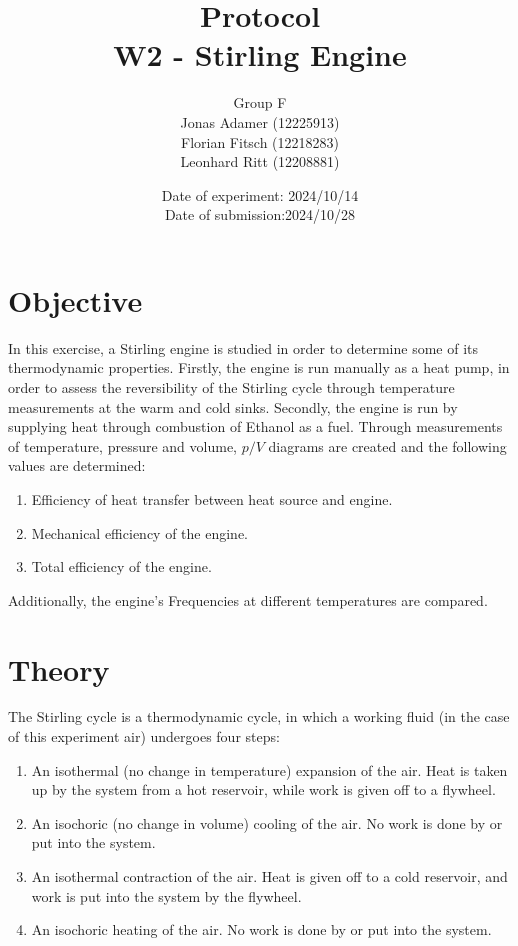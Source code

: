 \documentclass[titlepage]{article}
\title{Protocol \\ W2 - Stirling Engine}
\author{Group F\\Jonas Adamer (12225913)\\Florian Fitsch (12218283)\\Leonhard Ritt (12208881)}
\date{Date of experiment: 2024/10/14\\Date of submission:2024/10/28}
\begin{document}
\maketitle
\thispagestyle{empty}

\newpage
\tableofcontents
\thispagestyle{fancy}


\newpage
\section{Objective}
In this exercise, a Stirling engine is studied in order to determine some of its thermodynamic properties. Firstly, the engine is run manually as a heat pump, in order to assess the reversibility of the Stirling cycle through temperature measurements at the warm and cold sinks. Secondly, the engine is run by supplying heat through combustion of Ethanol as a fuel. Through measurements of temperature, pressure and volume, \(p/V\) diagrams are created and the following values are determined:
\begin{enumerate}
    \item Efficiency of heat transfer between heat source and engine.
    \item Mechanical efficiency of the engine.
    \item Total efficiency of the engine.
\end{enumerate}
Additionally, the engine's Frequencies at different temperatures are compared. 


\section{Theory}
The Stirling cycle is a thermodynamic cycle, in which a working fluid (in the case of this experiment air) undergoes four steps:
%
\begin{enumerate}
    \item An isothermal (no change in temperature) expansion of the air. Heat is taken up by the system from a hot reservoir, while work is given off to a flywheel.
    \item An isochoric (no change in volume) cooling of the air. No work is done by or put into the system.
    \item An isothermal contraction of the air. Heat is given off to a cold reservoir, and work is put into the system by the flywheel.
    \item An isochoric heating of the air. No work is done by or put into the system.
\end{enumerate}
\end{document}
